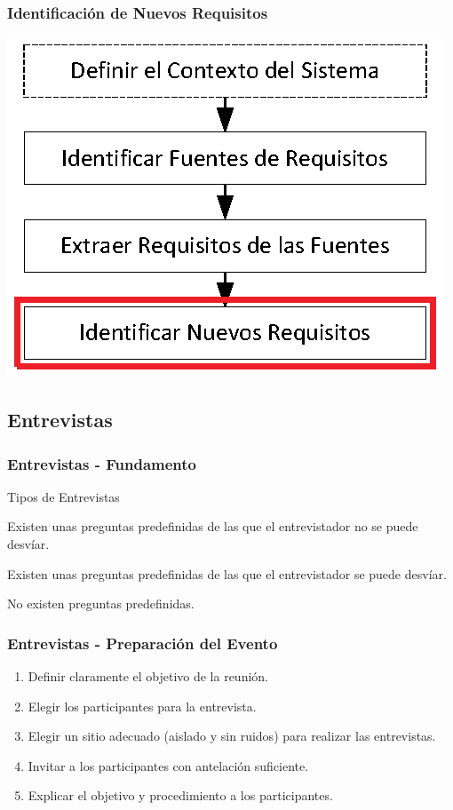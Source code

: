 \documentclass[a4paper,t,xcolor=pst,dvips]{beamer}
\begin{document}
\begin{frame}[c]
	\frametitle{Identificación de Nuevos Requisitos}
	\begin{center}
		\includegraphics[width=0.75\linewidth]{images/proceso/requisitosNuevos.eps}
	\end{center}
\end{frame}

\subsection{Entrevistas}

\begin{frame}[t]
    \frametitle{Entrevistas - Fundamento}
    \begin{block}{Tipos de Entrevistas}
        \begin{description}[<+->]
            \item[Estandarizada] Existen unas preguntas predefinidas de las que el entrevistador no se puede desvíar.
            \item[Exploratoria] Existen unas preguntas predefinidas de las que el entrevistador se puede desvíar.
            \item[No estructurada] No existen preguntas predefinidas.
        \end{description}
    \end{block}
\end{frame}

\begin{frame}[c]
    \frametitle{Entrevistas - Preparación del Evento}
    \begin{enumerate}[<+->]
        \item Definir claramente el objetivo de la reunión.
        \item Elegir los participantes para la entrevista.
        \item Elegir un sitio adecuado (aislado y sin ruidos) para realizar las entrevistas.
        \item Invitar a los participantes con antelación suficiente.
        \item Explicar el objetivo y procedimiento a los participantes.
    \end{enumerate}
\end{frame}
\end{document}
